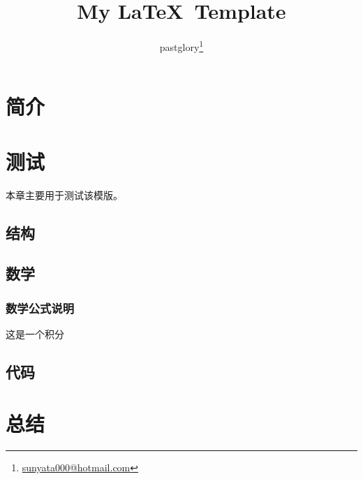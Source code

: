 \documentclass[zh, a4paper, 12pt]{pgreport}
\title {My \LaTeX\ Template}
\author{pastglory\thanks{\href{mailto:sunyata000@hotmail.com}{sunyata000@hotmail.com}}}
\date{}
\begin{document}
\maketitle
\tableofcontents

\newpage

\begin{abstract}
    \normalsize
    
\end{abstract}

\newpage

\section{简介}


\section{测试}
本章主要用于测试该模版。

\subsection{结构}


\subsection{数学}


\subsubsection{数学公式说明}
这是一个积分

\subsection{代码}


\section{总结}



\end{document}
